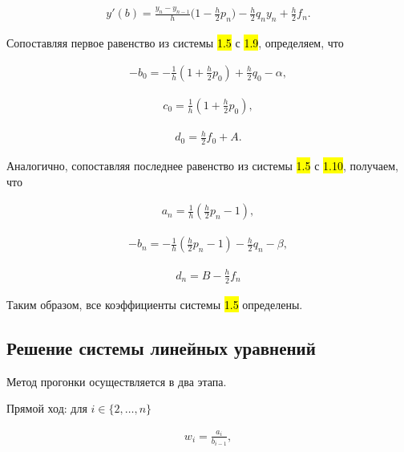 \begin{gather}
    y'(b) = \frac{y_n - y_{n-1}}{h} \Big(1 - \frac{h}{2} p_n \Big) - \frac{h}{2} q_n y_n + \frac{h}{2} f_n.
\end{gather}

Сопоставляя первое равенство из системы \hl{1.5} с \hl{1.9}, определяем, что

\hs
\begin{gather}
    -b_0 = -\frac{1}{h} \left( 1 + \frac{h}{2} p_0 \right) + \frac{h}{2} q_0 - \alpha,
\end{gather}

\begin{gather}
    c_0 = \frac{1}{h} \left( 1 + \frac{h}{2} p_0 \right),
\end{gather}

\begin{gather}
    d_0 = \frac{h}{2} f_0 + A.
\end{gather}

Аналогично, сопоставляя последнее равенство из системы \hl{1.5} с \hl{1.10}, получаем, что

\hs
\begin{gather}
    a_n = \frac{1}{h} \left( \frac{h}{2} p_n - 1 \right),
\end{gather}

\begin{gather}
    -b_n = -\frac{1}{h} \left( \frac{h}{2} p_n - 1 \right) - \frac{h}{2} q_n - \beta,
\end{gather}

\begin{gather}
    d_n = B - \frac{h}{2} f_n
\end{gather}

Таким образом, все коэффициенты системы \hl{1.5} определены.

\subsection{Решение системы линейных уравнений}

Метод прогонки осуществляется в два этапа. \par

\vspace{\baselineskip}

Прямой ход: для $ i \in \{2, \dots, n\} $

\hs
\begin{gather}
    w_i = \frac{a_i}{b_{i-1}},
\end{gather}

